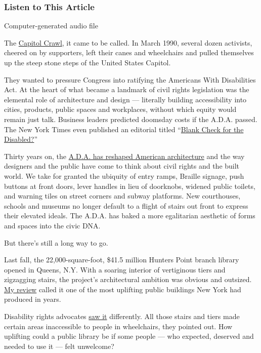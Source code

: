 \hypertarget{listen-to-this-article}{%
\subsubsection{Listen to This Article}\label{listen-to-this-article}}

Computer-generated audio file

The \href{https://vimeo.com/328233990}{Capitol Crawl}, it came to be
called. In March 1990, several dozen activists, cheered on by
supporters, left their canes and wheelchairs and pulled themselves up
the steep stone steps of the United States Capitol.

They wanted to pressure Congress into ratifying the Americans With
Disabilities Act. At the heart of what became a landmark of civil rights
legislation was the elemental role of architecture and design ---
literally building accessibility into cities, products, public spaces
and workplaces, without which equity would remain just talk. Business
leaders predicted doomsday costs if the A.D.A. passed. The New York
Times even published an editorial titled
``\href{https://www.nytimes3xbfgragh.onion/1989/09/06/opinion/blank-check-for-the-disabled.html}{Blank
Check for the Disabled?}''

Thirty years on, the
\href{https://www.curbed.com/2015/7/23/9937976/how-the-americans-with-disabilities-act-transformed-architecture}{A.D.A.
has reshaped American architecture} and the way designers and the public
have come to think about civil rights and the built world. We take for
granted the ubiquity of entry ramps, Braille signage, push buttons at
front doors, lever handles in lieu of doorknobs, widened public toilets,
and warning tiles on street corners and subway platforms. New
courthouses, schools and museums no longer default to a flight of stairs
out front to express their elevated ideals. The A.D.A. has baked a more
egalitarian aesthetic of forms and spaces into the civic DNA.

But there's still a long way to go.

Last fall, the 22,000-square-foot, \$41.5 million Hunters Point branch
library opened in Queens, N.Y. With a soaring interior of vertiginous
tiers and zigzagging stairs, the project's architectural ambition was
obvious and outsized.
\href{https://www.nytimes3xbfgragh.onion/2019/09/18/arts/design/hunters-point-community-library.html}{My
review} called it one of the most uplifting public buildings New York
had produced in years.

Disability rights advocates
\href{https://gothamist.com/news/new-41-million-hunters-point-library-has-one-major-flaw}{saw
it} differently. All those stairs and tiers made certain areas
inaccessible to people in wheelchairs, they pointed out. How uplifting
could a public library be if some people --- who expected, deserved and
needed to use it --- felt unwelcome?

